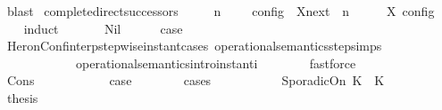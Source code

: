 \begin{isabellebody}
\ blast%
\endisatagproof
{\isafoldproof}%
%
\isadelimproof
%
\endisadelimproof
%
\isadelimdocument
%
\endisadelimdocument
%
\isatagdocument
%
\isamarkuptrue%
%
\endisatagdocument
{\isafolddocument}%
%
\isadelimdocument
%
\endisadelimdocument
{}\isamarkupfalse%
\ complete{\isacharunderscore}direct{\isacharunderscore}successors{\isacharcolon}\isanewline
\ \ \ {\isacartoucheopen}{\isasymlbrakk}\ {\isasymGamma}{\isacharcomma}\ n\ {\isasymturnstile}\ {\isasymPsi}\ {\isasymtriangleright}\ {\isasymPhi}\ {\isasymrbrakk}\isactrlsub c\isactrlsub o\isactrlsub n\isactrlsub f\isactrlsub i\isactrlsub g\ {\isasymsubseteq}\ {\isacharparenleft}{\isasymUnion}X{\isasymin}{\isasymC}\isactrlsub n\isactrlsub e\isactrlsub x\isactrlsub t\ {\isacharparenleft}{\isasymGamma}{\isacharcomma}\ n\ {\isasymturnstile}\ {\isasymPsi}\ {\isasymtriangleright}\ {\isasymPhi}{\isacharparenright}{\isachardot}\ {\isasymlbrakk}\ X\ {\isasymrbrakk}\isactrlsub c\isactrlsub o\isactrlsub n\isactrlsub f\isactrlsub i\isactrlsub g{\isacharparenright}{\isacartoucheclose}\isanewline
%
\isadelimproof
\ \ %
\endisadelimproof
%
\isatagproof
{}\isamarkupfalse%
\ {\isacharparenleft}induct\ {\isasymPsi}{\isacharparenright}\isanewline
\ \ \ \ \isamarkupfalse%
\ Nil\isanewline
\ \ \ \ \isamarkupfalse%
\ {\isacharquery}case\isanewline
\ \ \ \ \ \ \isamarkupfalse%
\ HeronConf{\isacharunderscore}interp{\isacharunderscore}stepwise{\isacharunderscore}instant{\isacharunderscore}cases\ operational{\isacharunderscore}semantics{\isacharunderscore}step{\isachardot}simps\isanewline
\ \ \ \ \ \ \ \ \ \ \ \ operational{\isacharunderscore}semantics{\isacharunderscore}intro{\isachardot}instant{\isacharunderscore}i\isanewline
\ \ \ \ \ \ \isamarkupfalse%
\ fastforce\isanewline
\ \ \isamarkupfalse%
\isanewline
\ \ \ \ \isamarkupfalse%
\ {\isacharparenleft}Cons\ {\isasympsi}\ {\isasymPsi}{\isacharparenright}\isanewline
\ \ \ \ \ \ \isamarkupfalse%
\ \isamarkupfalse%
\ {\isacharquery}case\isanewline
\ \ \ \ \ \ \isamarkupfalse%
\ {\isacharparenleft}cases\ {\isasympsi}{\isacharparenright}\isanewline
\ \ \ \ \ \ \ \ \isamarkupfalse%
\ {\isacharparenleft}SporadicOn\ K{}\ {\isasymtau}\ K{}{\isacharparenright}\isanewline
\ \ \ \ \ \ \ \ \isamarkupfalse%
\ \isamarkupfalse%
\ {\isacharquery}thesis\ \isanewline
\ \ \ \ \ \ \ \ \ \ \isamarkupfalse%

\end{isabellebody}
